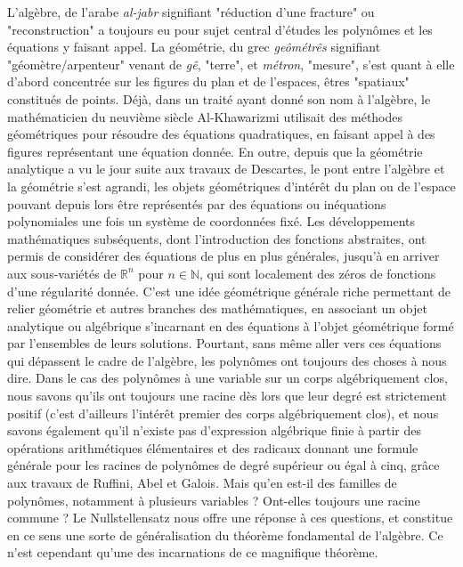 \documentclass[10pt, twoside]{article}
\theoremstyle{plain}
\theoremstyle{definition}
\theoremstyle{plain}
\theoremstyle{plain}
\theoremstyle{definition}
\theoremstyle{remark}
\begin{document}
L'algèbre, de l'arabe \textit{al-jabr} signifiant "réduction d'une fracture" ou "reconstruction" a toujours eu pour sujet central d'études les polynômes et les équations y faisant appel. La géométrie, du grec \textit{geômétrês} signifiant "géomètre/arpenteur" venant de \textit{gê}, "terre", et \textit{métron}, "mesure", s'est quant à elle d'abord concentrée sur les figures du plan et de l'espaces, êtres "spatiaux" constitués de points. Déjà, dans un traité ayant donné son nom à l'algèbre, le mathématicien du neuvième siècle Al-Khawarizmi utilisait des méthodes géométriques pour résoudre des équations quadratiques, en faisant appel à des figures représentant une équation donnée. En outre, depuis que la géométrie analytique a vu le jour suite aux travaux de Descartes, le pont entre l'algèbre et la géométrie s'est agrandi, les objets géométriques d'intérêt du plan ou de l'espace pouvant depuis lors être représentés par des équations ou inéquations polynomiales une fois un système de coordonnées fixé. Les développements mathématiques subséquents, dont l'introduction des fonctions abstraites, ont permis de considérer des équations de plus en plus générales, jusqu'à en arriver aux sous-variétés de $\mathbb{R}^n$ pour $n \in \mathbb{N}$, qui sont localement des zéros de fonctions d'une régularité donnée. C'est une idée géométrique générale riche permettant de relier géométrie et autres branches des mathématiques, en associant un objet analytique ou algébrique s'incarnant en des équations à l'objet géométrique formé par l'ensembles de leurs solutions. Pourtant, sans même aller vers ces équations qui dépassent le cadre de l'algèbre, les polynômes ont toujours des choses à nous dire. Dans le cas des polynômes à une variable sur un corps algébriquement clos, nous savons qu'ils ont toujours une racine dès lors que leur degré est strictement positif (c'est d'ailleurs l'intérêt premier des corps algébriquement clos), et nous savons également qu'il n'existe pas d'expression algébrique finie à partir des opérations arithmétiques élémentaires et des radicaux donnant une formule générale pour les racines de polynômes de degré supérieur ou égal à cinq, grâce aux travaux de Ruffini, Abel et Galois. Mais qu'en est-il des familles de polynômes, notamment à plusieurs variables ? Ont-elles toujours une racine commune ? Le Nullstellensatz nous offre une réponse à ces questions, et constitue en ce sens une sorte de généralisation du théorème fondamental de l'algèbre. Ce n'est cependant qu'une des incarnations de ce magnifique théorème.
\end{document}
